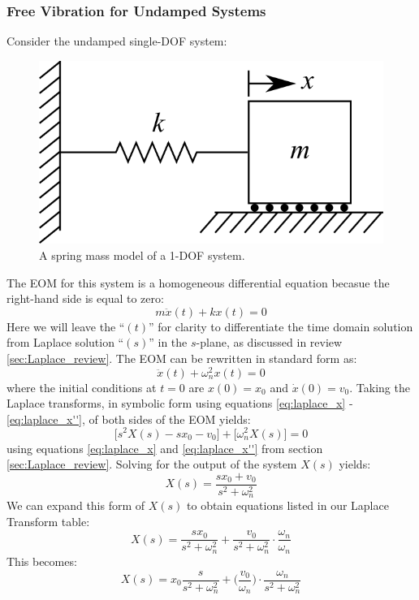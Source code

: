\documentclass[12pt,letter]{article}
\begin{document}
			\subsubsection{Free Vibration for Undamped Systems}
			Consider the undamped single-DOF system:
			\begin{figure}[H]
				\centering
				\includegraphics[]{../figures/1-DOF-spring_mass_horizontal.png}
				\caption{A spring mass model of a 1-DOF system.}
			\end{figure}
			\noindent The EOM for this system is a homogeneous differential equation becasue the right-hand side is equal to zero:
			\begin{equation}
				m\ddot{x}(t) + kx(t) = 0 
			\end{equation}
			Here we will leave the ``$(t)$'' for clarity to differentiate the time domain solution from Laplace solution ``$(s)$'' in the $s$-plane, as discussed in review \ref{sec:Laplace_review}. The EOM can be rewritten in standard form as:
			\begin{equation}
				\ddot{x}(t) + \omega_n^2x(t) = 0 
			\end{equation}
			where the initial conditions at $t=0$ are $x(0)=x_0$ and $\dot{x}(0) = v_0$. Taking the Laplace transforms, in symbolic form using equations \ref{eq:laplace_x} - \ref{eq:laplace_x''}, of both sides of the EOM yields:
			\begin{equation}
				\big[s^2X(s) -sx_0 -v_0 \big] + \big[ \omega_n^2X(s) \big] =0
			\end{equation}
			using equations \ref{eq:laplace_x} and \ref{eq:laplace_x''} from section \ref{sec:Laplace_review}. Solving for the output of the system $X(s)$ yields:
			\begin{equation}
			X(s) = \frac{sx_0 + v_0}{s^2 + \omega_n^2}
			\end{equation}
			We can expand this form of $X(s)$ to obtain equations listed in our Laplace Transform table:
			\begin{equation}
			X(s) = \frac{sx_0}{s^2 + \omega_n^2} + \frac{v_0}{s^2 + \omega_n^2}\cdot \frac{\omega_n}{\omega_n}
			\end{equation}
			This becomes:
			\begin{equation}
			X(s) = x_0\frac{s}{s^2 + \omega_n^2} + \bigg(\frac{v_0}{\omega_n}\bigg) \cdot \frac{\omega_n}{s^2 + \omega_n^2}
			\end{equation}
			
\end{document}
